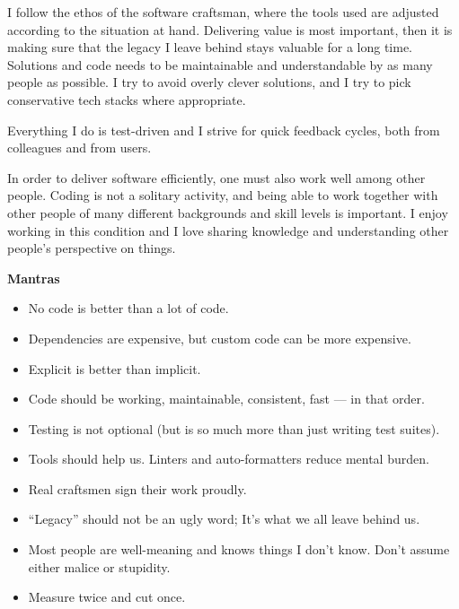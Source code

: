 \documentclass[9pt]{template} %
\begin{document}
\begin{minipage}[t]{0.4\textwidth} %
  \vspace{-\baselineskip}

  I follow the ethos of the software craftsman, where the tools used are
  adjusted according to the situation at hand. Delivering value is most
  important, then it is making sure that the legacy I leave behind stays
  valuable for a long time. Solutions and code needs to be maintainable and
  understandable by as many people as possible. I try to avoid overly clever
  solutions, and I try to pick conservative tech stacks where appropriate.

  Everything I do is test-driven and I strive for quick feedback cycles, both
  from colleagues and from users.

  In order to deliver software efficiently, one must also work well among other
  people. Coding is not a solitary activity, and being able to work together
  with other people of many different backgrounds and skill levels is
  important. I enjoy working in this condition and I love sharing knowledge and
  understanding other people's perspective on things.
\end{minipage}
\hfill
\begin{minipage}[t]{0.5\textwidth}
  \vspace{-\baselineskip}
  \textbf{Mantras}
  \begin{itemize}
      \item No code is better than a lot of code.
      \item Dependencies are expensive, but custom code can be more expensive.
      \item Explicit is better than implicit.
      \item Code should be working, maintainable, consistent, fast --- in that order.
      \item Testing is not optional (but is so much more than just writing test suites).
      \item Tools should help us. Linters and auto-formatters reduce mental burden.
      \item Real craftsmen sign their work proudly.
      \item ``Legacy'' should not be an ugly word; It's what we all leave behind us.
      \item Most people are well-meaning and knows things I don't know. Don't assume either malice or stupidity.
      \item Measure twice and cut once.
  \end{itemize}
\end{minipage}
\end{document}
